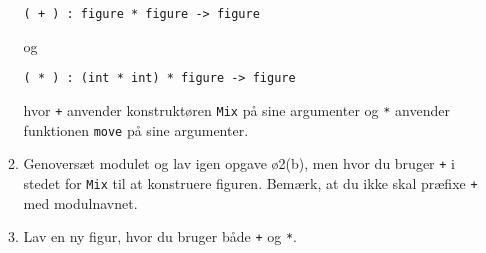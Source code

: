 \documentclass[a4paper]{article}
\begin{document}
\begin{enumerate}[ø1.]
\begin{enumerate}
  \texttt{( + ) : figure * figure -> figure}

  og

  \texttt{( * ) : (int * int) * figure -> figure}

  hvor \texttt{+} anvender konstruktøren \texttt{Mix} på sine argumenter
  og \texttt{*} anvender funktionen \texttt{move} på sine argumenter.

\item Genoversæt modulet og lav igen opgave ø2(b), men hvor du bruger \texttt{+} i
stedet for \texttt{Mix} til at konstruere figuren.  Bemærk, at du ikke
skal præfixe \texttt{+} med modulnavnet.

\item Lav en ny figur, hvor du bruger både \texttt{+} og \texttt{*}.

  \end{enumerate}
\end{enumerate}
\end{document}
